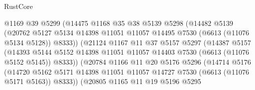 \begin{lexlean}{RustCore}
\begin{coremodule}
                            @1169
                            @39
                            @5299
                            (@14475
                              @1168
                              @35
                              @38
                              @5139
                              @5298
                              (@14482
                                @5139
                                (@20762
                                  @5127
                                  @5134
                                  @14398
                                  @11051
                                  @11057
                                  @14495
                                  @7530
                                  (@6613 (@11076 @5134 @5128))
                                  @8333))
                              (@21124
                                @1167
                                @11
                                @37
                                @5157
                                @5297
                                (@14387
                                  @5157
                                  (@14393
                                    @5144
                                    @5152
                                    @14398
                                    @11051
                                    @11057
                                    @14403
                                    @7530
                                    (@6613 (@11076 @5152 @5145))
                                    @8333))
                                (@20784
                                  @1166
                                  @11
                                  @20
                                  @5176
                                  @5296
                                  (@14714
                                    @5176
                                    (@14720
                                      @5162
                                      @5171
                                      @14398
                                      @11051
                                      @11057
                                      @14727
                                      @7530
                                      (@6613 (@11076 @5171 @5163))
                                      @8333))
                                  (@20805
                                    @1165
                                    @11
                                    @19
                                    @5196
                                    @5295

\end{coremodule}
\end{lexlean}
